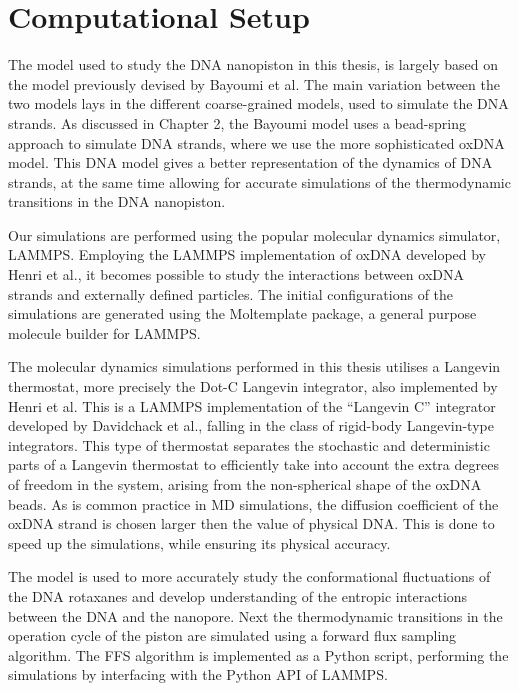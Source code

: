 \section{Computational Setup}

The model used to study the DNA nanopiston in this thesis, is largely based on the model
previously devised by Bayoumi et al. The main variation between the two models lays in
the different coarse-grained models, used to simulate the DNA strands. As discussed in
Chapter 2, the Bayoumi model uses a bead-spring approach to simulate DNA strands, where
we use the more sophisticated oxDNA model. This DNA model gives a better
representation of the dynamics of DNA strands, at the same time allowing for accurate
simulations of the thermodynamic transitions in the DNA nanopiston.

Our simulations are performed using the popular molecular dynamics simulator,
LAMMPS.\cite{PLIMPTON19951} Employing the LAMMPS implementation of oxDNA developed by
Henri et al.,
it becomes possible to study the interactions between oxDNA strands and externally
defined particles.\cite{Henrich18} The initial configurations of the simulations are
generated using the
Moltemplate package, a general purpose molecule builder for LAMMPS.\cite{JEWETT2021}

The molecular dynamics simulations performed in this thesis utilises a Langevin
thermostat, more precisely the Dot-C Langevin integrator, also implemented by Henri et
al. This is a LAMMPS implementation of the “Langevin C” integrator developed by
Davidchack et al., falling in the class of rigid-body Langevin-type
integrators.\cite{Davidchack2015}
This type of thermostat separates the stochastic and deterministic parts of a Langevin
thermostat to efficiently take into account the extra degrees of freedom in the system,
arising from the non-spherical shape of the oxDNA beads. As is common practice in MD
simulations, the diffusion coefficient of the oxDNA strand is chosen larger then the
value of physical DNA. This is done to speed up the simulations, while ensuring its
physical accuracy.

The model is used to more accurately study the conformational fluctuations of
the DNA rotaxanes and develop understanding of the entropic interactions between the DNA
and the nanopore. Next the thermodynamic transitions in the operation cycle of the piston
are simulated using a forward flux sampling algorithm. The FFS algorithm is implemented
as a Python script, performing the simulations by interfacing with the Python API of
LAMMPS.
